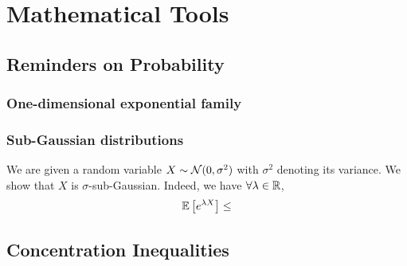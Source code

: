 \chapter{Mathematical Tools}\label{chap:maths}


\section{Reminders on Probability}\label{app:maths.proba}

\subsection{One-dimensional exponential family}\label{app:maths.proba.exponential}


\subsection{Sub-Gaussian distributions}\label{app:maths.proba.subgaussian}

\begin{definition}

\end{definition}

\begin{example}
	We are given a random variable $X \sim \mathcal{N}(0,\sigma^2)$ with $\sigma^2$ denoting its variance. We show that $X$ is $\sigma$-sub-Gaussian. Indeed, we have $\forall \lambda\in\mathbb{R}$,
	\begin{align*}
		\mathbb{E}\left[e^{\lambda X}\right] &\leq \\
	\end{align*}
\end{example}

\section{Concentration Inequalities}\label{app:maths.concentration}

